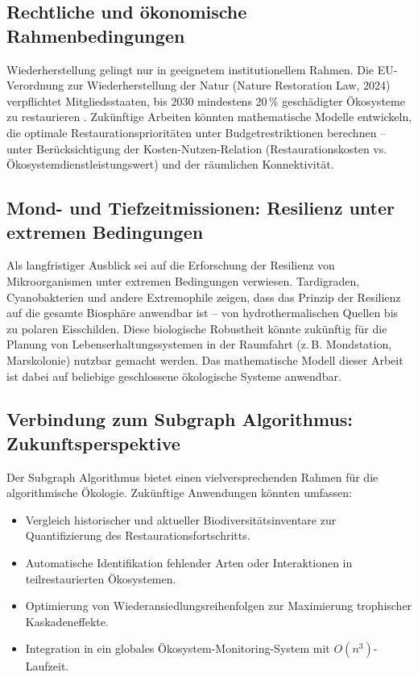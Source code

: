 ﻿\documentclass[a4paper,12pt]{article}
\theoremstyle{definition}
\begin{document}
\subsection{Rechtliche und ökonomische Rahmenbedingungen}

Wiederherstellung gelingt nur in geeignetem institutionellem Rahmen. Die EU-Verordnung zur Wiederherstellung der Natur (Nature Restoration Law, 2024) verpflichtet Mitgliedsstaaten, bis 2030 mindestens 20\,\% geschädigter Ökosysteme zu restaurieren \cite{eu2024nrl}. Zukünftige Arbeiten könnten mathematische Modelle entwickeln, die optimale Restaurationsprioritäten unter Budgetrestriktionen berechnen -- unter Berücksichtigung der Kosten-Nutzen-Relation (Restaurationskosten vs. Ökosystemdienstleistungswert) und der räumlichen Konnektivität.

\subsection{Mond- und Tiefzeitmissionen: Resilienz unter extremen Bedingungen}

Als langfristiger Ausblick sei auf die Erforschung der Resilienz von Mikroorganismen unter extremen Bedingungen verwiesen. Tardigraden, Cyanobakterien und andere Extremophile zeigen, dass das Prinzip der Resilienz auf die gesamte Biosphäre anwendbar ist -- von hydrothermalischen Quellen bis zu polaren Eisschilden. Diese biologische Robustheit könnte zukünftig für die Planung von Lebenserhaltungssystemen in der Raumfahrt (z.\,B. Mondstation, Marskolonie) nutzbar gemacht werden. Das mathematische Modell dieser Arbeit ist dabei auf beliebige geschlossene ökologische Systeme anwendbar.

\subsection{Verbindung zum Subgraph Algorithmus: Zukunftsperspektive}

Der Subgraph Algorithmus \cite{epp2026subgraph} bietet einen vielversprechenden Rahmen für die algorithmische Ökologie. Zukünftige Anwendungen könnten umfassen:
\begin{itemize}
	\item Vergleich historischer und aktueller Biodiversitätsinventare zur Quantifizierung des Restaurationsfortschritts.
	\item Automatische Identifikation fehlender Arten oder Interaktionen in teilrestaurierten Ökosystemen.
	\item Optimierung von Wiederansiedlungsreihenfolgen zur Maximierung trophischer Kaskadeneffekte.
	\item Integration in ein globales Ökosystem-Monitoring-System mit $O(n^3)$-Laufzeit.
\end{itemize}
\end{document}
